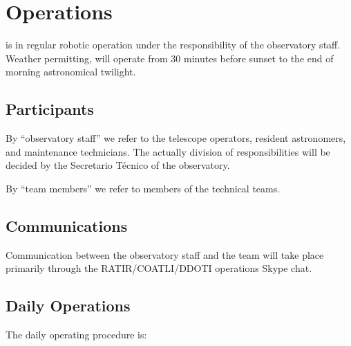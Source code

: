 \chapter{Operations}
\label{chapter:operations}

{\projectname} is in regular robotic operation under the responsibility of the observatory staff. Weather permitting, {\projectname} will operate from 30 minutes before sunset to the end of morning astronomical twilight.

\section{Participants}

By “observatory staff” we refer to the telescope operators, resident astronomers, and maintenance technicians. The actually division of responsibilities will be decided by the Secretario Técnico of the observatory.

By “team members” we refer to members of the {\projectname} technical teams.

\section{Communications}

Communication between the observatory staff and the team will take place primarily through the RATIR/COATLI/DDOTI operations Skype chat.

\section{Daily Operations}

The daily operating procedure is:


